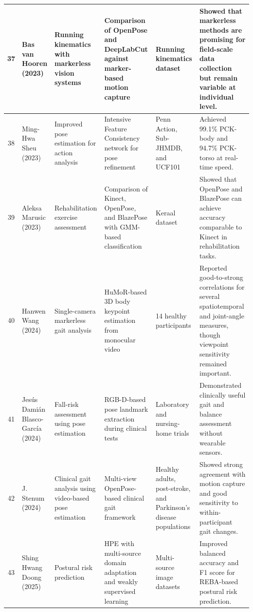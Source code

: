 \documentclass[12pt]{elsarticle}
\begin{document}
{\begin{longtable}{c p{2.7cm} p{2.8cm} p{3.3cm} p{3.4cm} p{3.6cm}}
37 & Bas van Hooren \cite{van2023accuracy} (2023) & Running kinematics with markerless vision systems & Comparison of OpenPose and DeepLabCut against marker-based motion capture & Running kinematics dataset & Showed that markerless methods are promising for field-scale data collection but remain variable at individual level. \\
\hline

38 & Ming-Hwa Sheu \cite{sheu2023improvement} (2023) & Improved pose estimation for action analysis & Intensive Feature Consistency network for pose refinement & Penn Action, Sub-JHMDB, and UCF101 & Achieved 99.1\% PCK-body and 94.7\% PCK-torso at real-time speed. \\
\hline

39 & Aleksa Marusic \cite{marusic2023evaluating} (2023) & Rehabilitation exercise assessment & Comparison of Kinect, OpenPose, and BlazePose with GMM-based classification & Keraal dataset & Showed that OpenPose and BlazePose can achieve accuracy comparable to Kinect in rehabilitation tasks. \\
\hline

40 & Hanwen Wang \cite{wang2024markerless} (2024) & Single-camera markerless gait analysis & HuMoR-based 3D body keypoint estimation from monocular video & 14 healthy participants & Reported good-to-strong correlations for several spatiotemporal and joint-angle measures, though viewpoint sensitivity remained important. \\
\hline

41 & Jesús Damián Blasco-García \cite{blasco2024computer} (2024) & Fall-risk assessment using pose estimation & RGB-D-based pose landmark extraction during clinical tests & Laboratory and nursing-home trials & Demonstrated clinically useful gait and balance assessment without wearable sensors. \\
\hline

42 & J. Stenum \cite{stenum2024clinical} (2024) & Clinical gait analysis using video-based pose estimation & Multi-view OpenPose-based clinical gait framework & Healthy adults, post-stroke, and Parkinson’s disease populations & Showed strong agreement with motion capture and good sensitivity to within-participant gait changes. \\
\hline

43 & Shing Hwang Doong \cite{doong2025predicting} (2025) & Postural risk prediction & HPE with multi-source domain adaptation and weakly supervised learning & Multi-source image datasets & Improved balanced accuracy and F1 score for REBA-based postural risk prediction. \\
\hline


\end{longtable}}
\end{document}
